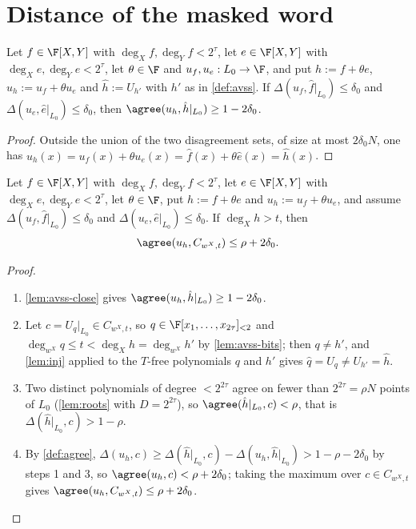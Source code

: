 {{\section{Distance of the masked word}

\begin{lemma}\label{lem:avss-close}
Let $f\in\F[X,Y]$ with $\deg_Xf,\deg_Yf<2^\tau$, let $e\in\F[X,Y]$ with $\deg_Xe,\deg_Ye<2^\tau$,
let $\theta\in\F$ and $u_f,u_e:L_0\to\F$, and put $h:=f+\theta e$, $u_h:=u_f+\theta u_e$ and $\hat h:=U_{h'}$ with $h'$ as in
\ref{def:avss}. If $\Delta(u_f,\hat f|_{L_0})\le\delta_0$ and
$\Delta(u_e,\hat e|_{L_0})\le\delta_0$, then $\agree(u_h,\hat h|_{L_0})\ge1-2\delta_0$.
\end{lemma}

\begin{proof}
Outside the union of the two disagreement sets, of size at most $2\delta_0N$, one has
$u_h(x)=u_f(x)+\theta u_e(x)=\hat f(x)+\theta\hat e(x)=\hat h(x)$.
\end{proof}

\begin{lemma}\label{lem:avss-dist}
Let $f\in\F[X,Y]$ with $\deg_Xf,\deg_Yf<2^\tau$, let $e\in\F[X,Y]$ with $\deg_Xe,\deg_Ye<2^\tau$, let $\theta\in\F$, put
$h:=f+\theta e$ and $u_h:=u_f+\theta u_e$, and assume
$\Delta(u_f,\hat f|_{L_0})\le\delta_0$ and $\Delta(u_e,\hat e|_{L_0})\le\delta_0$. If
$\deg_Xh>t$, then
\[
\agree(u_h,C_{w^X,t})\le\rho+2\delta_0 .
\]
\end{lemma}

\begin{proof}\begin{enumerate}
\item \ref{lem:avss-close} gives $\agree(u_h,\hat h|_{L_0})\ge1-2\delta_0$.
\item Let $c=U_q|_{L_0}\in C_{w^X,t}$, so $q\in\F[x_1,\dots,x_{2\tau}]_{<2}$ and
$\deg_{w^X}q\le t<\deg_Xh=\deg_{w^X}h'$ by \ref{lem:avss-bits}; then $q\ne h'$, and
\ref{lem:inj} applied to the $T$-free polynomials $q$ and $h'$ gives
$\hat q=U_q\ne U_{h'}=\hat h$.
\item Two distinct polynomials of degree $<2^{2\tau}$ agree on fewer than $2^{2\tau}=\rho N$
points of $L_0$ (\ref{lem:roots} with $D=2^{2\tau}$), so
$\agree(\hat h|_{L_0},c)<\rho$, that is $\Delta(\hat h|_{L_0},c)>1-\rho$.
\item By \ref{def:agree}, $\Delta(u_h,c)\ge\Delta(\hat h|_{L_0},c)-\Delta(u_h,\hat h|_{L_0})
>1-\rho-2\delta_0$ by steps 1 and 3, so $\agree(u_h,c)<\rho+2\delta_0$; taking the maximum over
$c\in C_{w^X,t}$ gives $\agree(u_h,C_{w^X,t})\le\rho+2\delta_0$.
\end{enumerate}\end{proof}

}}
